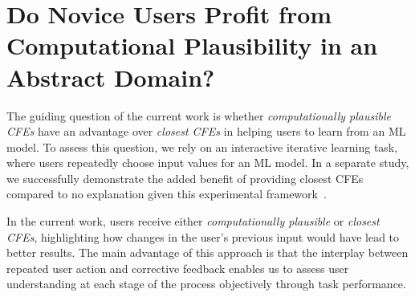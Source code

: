 
\section{Do Novice Users Profit from Computational Plausibility in an Abstract Domain?}\label{sec:hypotheses}


The guiding question of the current work is whether \textit{computationally plausible \glspl{CFE}} have an advantage over \textit{closest \glspl{CFE}} in helping users to learn from an \gls{ML} model.
To assess this question, we rely on an interactive iterative learning task, where users repeatedly choose input values for an \gls{ML} model.
In a separate study, we successfully demonstrate the added benefit of providing closest \glspl{CFE} compared to no explanation given this experimental framework~\citep{IAZ ARXIV}.

In the current work, users receive either \textit{computationally plausible} or \textit{closest \glspl{CFE}}, highlighting how changes in the user's previous input would have lead to better results.
The main advantage of this approach is that the interplay between repeated user action and corrective feedback enables us to assess user understanding at each stage of the process objectively through task performance.

